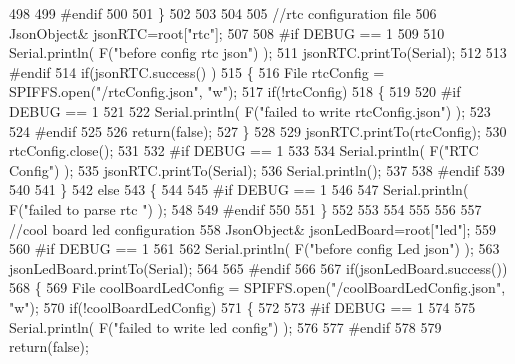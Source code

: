 \begin{DoxyCode}
498     
499 \textcolor{preprocessor}{    #endif}
500 
501     \}
502     
503     
504     
505     \textcolor{comment}{//rtc configuration file}
506         JsonObject& jsonRTC=root[\textcolor{stringliteral}{"rtc"}];
507 
508 \textcolor{preprocessor}{#if DEBUG == 1 }
509     
510     Serial.println( F(\textcolor{stringliteral}{"before config rtc json"}) );
511     jsonRTC.printTo(Serial);
512 
513 \textcolor{preprocessor}{#endif}
514     \textcolor{keywordflow}{if}(jsonRTC.success() )
515     \{
516         File rtcConfig = SPIFFS.open(\textcolor{stringliteral}{"/rtcConfig.json"}, \textcolor{stringliteral}{"w"});   
517         \textcolor{keywordflow}{if}(!rtcConfig)
518         \{
519         
520 \textcolor{preprocessor}{        #if DEBUG == 1 }
521 
522             Serial.println( F(\textcolor{stringliteral}{"failed to write rtcConfig.json"}) );
523 
524 \textcolor{preprocessor}{        #endif}
525 
526             \textcolor{keywordflow}{return}(\textcolor{keyword}{false});
527         \}
528 
529         jsonRTC.printTo(rtcConfig);
530         rtcConfig.close();
531 
532 \textcolor{preprocessor}{    #if DEBUG == 1 }
533 
534         Serial.println( F(\textcolor{stringliteral}{"RTC Config"}) );
535         jsonRTC.printTo(Serial);
536         Serial.println();
537     
538 \textcolor{preprocessor}{    #endif}
539 
540     
541     \}
542     \textcolor{keywordflow}{else}
543     \{
544     
545 \textcolor{preprocessor}{    #if DEBUG == 1 }
546 
547         Serial.println( F(\textcolor{stringliteral}{"failed to parse rtc "}) );
548     
549 \textcolor{preprocessor}{    #endif}
550 
551     \}
552 
553     
554     
555     
556     
557         \textcolor{comment}{//cool board led configuration}
558         JsonObject& jsonLedBoard=root[\textcolor{stringliteral}{"led"}];
559     
560 \textcolor{preprocessor}{#if DEBUG == 1 }
561 
562     Serial.println( F(\textcolor{stringliteral}{"before config Led json"}) );
563     jsonLedBoard.printTo(Serial);
564 
565 \textcolor{preprocessor}{#endif}
566 
567     \textcolor{keywordflow}{if}(jsonLedBoard.success())
568     \{   
569         File coolBoardLedConfig = SPIFFS.open(\textcolor{stringliteral}{"/coolBoardLedConfig.json"}, \textcolor{stringliteral}{"w"}); 
570         \textcolor{keywordflow}{if}(!coolBoardLedConfig)
571         \{
572         
573 \textcolor{preprocessor}{        #if DEBUG == 1 }
574         
575             Serial.println( F(\textcolor{stringliteral}{"failed to write led config"}) );
576         
577 \textcolor{preprocessor}{        #endif}
578 
579             \textcolor{keywordflow}{return}(\textcolor{keyword}{false});

\end{DoxyCode}
